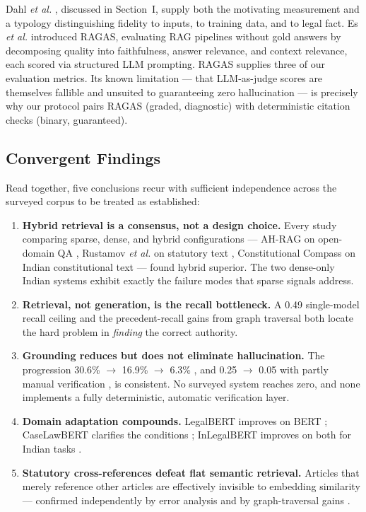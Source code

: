 \documentclass[conference]{IEEEtran}
\begin{document}
Dahl \textit{et al.} \cite{dahl2024}, discussed in Section~I, supply both the motivating measurement and a typology distinguishing fidelity to inputs, to training data, and to legal fact. Es \textit{et al.} \cite{es2023} introduced RAGAS, evaluating RAG pipelines without gold answers by decomposing quality into faithfulness, answer relevance, and context relevance, each scored via structured LLM prompting. RAGAS supplies three of our evaluation metrics. Its known limitation — that LLM-as-judge scores are themselves fallible and unsuited to guaranteeing zero hallucination — is precisely why our protocol pairs RAGAS (graded, diagnostic) with deterministic citation checks (binary, guaranteed).

\subsection{Convergent Findings}

Read together, five conclusions recur with sufficient independence across the surveyed corpus to be treated as established:

\begin{enumerate}
\item \textbf{Hybrid retrieval is a consensus, not a design choice.} Every study comparing sparse, dense, and hybrid configurations — AH-RAG on open-domain QA \cite{sun2025}, Rustamov \textit{et al.} on statutory text \cite{rustamov2025}, Constitutional Compass on Indian constitutional text \cite{bolla2026} — found hybrid superior. The two dense-only Indian systems exhibit exactly the failure modes that sparse signals address.
\item \textbf{Retrieval, not generation, is the recall bottleneck.} A 0.49 single-model recall ceiling \cite{rustamov2025} and the precedent-recall gains from graph traversal \cite{bindra2026} both locate the hard problem in \emph{finding} the correct authority.
\item \textbf{Grounding reduces but does not eliminate hallucination.} The progression 30.6\% $\rightarrow$ 16.9\% $\rightarrow$ 6.3\% \cite{bindra2026}, and 0.25 $\rightarrow$ 0.05 with partly manual verification \cite{dixit2025}, is consistent. No surveyed system reaches zero, and none implements a fully deterministic, automatic verification layer.
\item \textbf{Domain adaptation compounds.} LegalBERT improves on BERT \cite{chalkidis2020}; CaseLawBERT clarifies the conditions \cite{zheng2021}; InLegalBERT improves on both for Indian tasks \cite{paul2023}.
\item \textbf{Statutory cross-references defeat flat semantic retrieval.} Articles that merely reference other articles are effectively invisible to embedding similarity — confirmed independently by error analysis \cite{rustamov2025} and by graph-traversal gains \cite{bindra2026}.
\end{enumerate}
\end{document}
